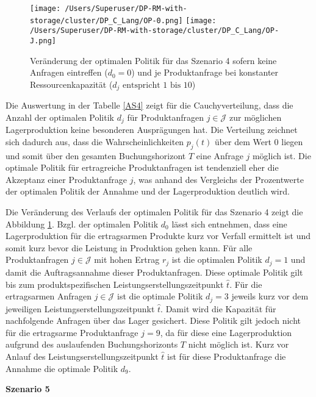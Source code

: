 \begin{figure}[h!]     
\begin{center}
\texttt{[image: /Users/Superuser/DP-RM-with-storage/cluster/DP\_C\_Lang/OP-0.png]}
\texttt{[image: /Users/Superuser/DP-RM-with-storage/cluster/DP\_C\_Lang/OP-J.png]}
    \caption{Veränderung der optimalen Politik für das Szenario 4 sofern keine Anfragen eintreffen ($d_0=0$) und je Produktanfrage bei konstanter Ressourcenkapazität ($d_j\text{ entspricht }1\text{ bis }10$)}  \label{SV4}
  \end{center}
\end{figure}

Die Auswertung in der Tabelle \ref{AS4} zeigt für die Cauchyverteilung, dass die Anzahl der optimalen Politik $d_j$ für Produktanfragen $j\in\mathcal{J}$ zur möglichen Lagerproduktion keine besonderen Ausprägungen hat. Die Verteilung zeichnet sich dadurch aus, dass die Wahrscheinlichkeiten $p_j(t)$ über dem Wert $0$ liegen und somit über den gesamten Buchungshorizont $T$ eine Anfrage $j$ möglich ist. Die optimale Politik für ertragreiche Produktanfragen ist tendenziell eher die Akzeptanz einer Produktanfrage $j$, was anhand des Vergleichs der Prozentwerte der optimalen Politik der Annahme und der Lagerproduktion deutlich wird.

Die Veränderung des Verlaufs der optimalen Politik für das Szenario 4 zeigt die Abbildung \ref{SV4}. Bzgl. der optimalen Politik $d_0$ lässt sich entnehmen, dass eine Lagerproduktion für die ertragsarmen Produkte kurz vor Verfall ermittelt ist und somit kurz bevor die Leistung in Produktion gehen kann. Für alle Produktanfragen $j\in\mathcal{J}$ mit hohen Ertrag $r_j$ ist die optimalen Politik $d_j=1$ und damit die Auftragsannahme dieser Produktanfragen. Diese optimale Politik gilt bis zum produktspezifischen Leistungserstellungszeitpunkt $\hat t$. Für die ertragsarmen Anfragen $j\in\mathcal{J}$ ist die optimale Politik $d_j=3$ jeweils kurz vor dem jeweiligen Leistungserstellungszeitpunkt $\hat t$. Damit wird die Kapazität für nachfolgende Anfragen über das Lager gesichert. Diese Politik gilt jedoch nicht für die ertragsarme Produktanfrage $j=9$, da für diese eine Lagerproduktion aufgrund des auslaufenden Buchungshorizonts $T$ nicht möglich ist. Kurz vor Anlauf des Leistungserstellungszeitpunkt $\hat t$ ist für diese Produktanfrage die Annahme die optimale Politik $d_9$.

\textbf{Szenario 5}

